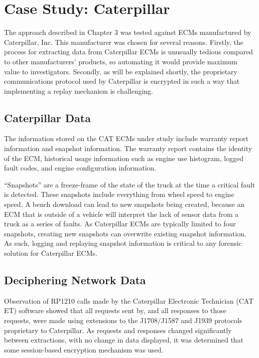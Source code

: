 \chapter{Case Study: Caterpillar}

The approach described in Chapter 3 was tested against ECMs manufactured by Caterpillar, Inc. This manufacturer was
chosen for several reasons. Firstly, the process for extracting data from Caterpillar ECMs is unusually tedious compared
to other manufacturers' products, so automating it would provide maximum value to investigators.
Secondly, as will be explained shortly, the proprietary communications protocol used
by Caterpillar is encrypted in such a way that implementing a replay mechanism is challenging.

\section{Caterpillar Data}

The information stored on the CAT ECMs under study include warranty report information and snapshot
information. The warranty report contains the identity of the ECM, historical usage information such as engine use histogram,
logged fault codes, and engine configuration information.

``Snapshots'' are a freeze-frame of the state of the truck at the time a critical fault is detected. These snapshots
include everything from wheel speed to engine speed. A bench download can lead to new snapshots being created, because an ECM that is outside
of a vehicle will interpret the lack of sensor data from a truck as a series of faults. As Caterpillar ECMs are typically
limited to four snapshots, creating new snapshots can overwrite existing snapshot information. As such, logging and replaying snapshot information is critical to any forensic solution for
Caterpillar ECMs.

\section{Deciphering Network Data}

Observation of RP1210 calls made by the Caterpillar Electronic Technician (CAT ET) software showed that all requests sent by,
and all responses to those requests, were made using extensions to the J1708/J1587 and J1939 protocols
proprietary to Caterpillar. As requests and responses changed significantly between extractions, with
no change in data displayed, it was determined that some session-based encryption mechanism was
used.

